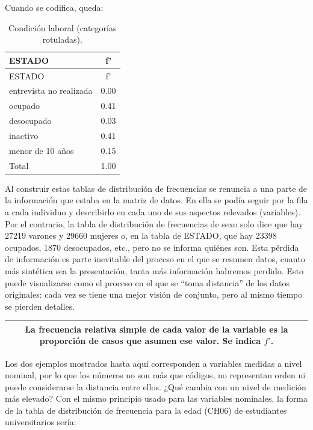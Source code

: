 \documentclass[]{book}
\begin{document}
Cuando se codifica, queda:

\begin{longtable}[]{@{}lc@{}}
\caption{\label{tab:unnamed-chunk-45}Condición laboral (categorías rotuladas).}\tabularnewline
\toprule
ESTADO & f'\tabularnewline
\midrule
\endfirsthead
\toprule
ESTADO & f'\tabularnewline
\midrule
\endhead
entrevista no realizada & 0.00\tabularnewline
ocupado & 0.41\tabularnewline
desocupado & 0.03\tabularnewline
inactivo & 0.41\tabularnewline
menor de 10 años & 0.15\tabularnewline
Total & 1.00\tabularnewline
\bottomrule
\end{longtable}

Al construir estas tablas de distribución de frecuencias se renuncia a una parte de la información que estaba en la matriz de datos. En ella se podía seguir por la fila a cada individuo y describirlo en cada uno de sus aspectos relevados (variables). Por el contrario, la tabla de distribución de frecuencias de sexo solo dice que hay 27219 varones y 29660 mujeres o, en la tabla de ESTADO, que hay 23398 ocupados, 1870 desocupados, etc., pero no se informa quiénes son. Esta pérdida de información es parte inevitable del proceso en el que se resumen datos, cuanto más sintética sea la presentación, tanta más información habremos perdido. Esto puede visualizarse como el proceso en el que se ``toma distancia'' de los datos originales: cada vez se tiene una mejor visión de conjunto, pero al mismo tiempo se pierden detalles.

\begin{longtable}[]{@{}c@{}}
\toprule
\endhead
\begin{minipage}[t]{0.97\columnwidth}\centering
La \textbf{frecuencia relativa simple} de cada valor de la variable es la proporción de casos que asumen ese valor. Se indica \(f'\).\strut
\end{minipage}\tabularnewline
\bottomrule
\end{longtable}

Los dos ejemplos mostrados hasta aquí corresponden a variables medidas a nivel nominal, por lo que los números no son más que códigos, no representan orden ni puede considerarse la distancia entre ellos. ¿Qué cambia con un nivel de medición más elevado? Con el mismo principio usado para las variables nominales, la forma de la tabla de distribución de frecuencia para la edad (CH06) de estudiantes universitarios sería:
\end{document}
